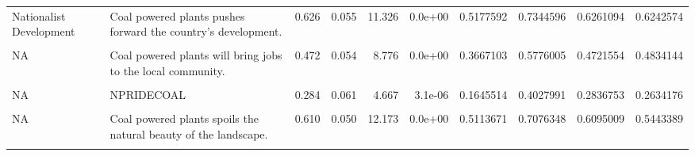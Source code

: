 \documentclass[
]{article}
\begin{document}
\begin{landscape}
\begin{table}[!h]
{\begin{tabular}[t]{l>{\raggedright\arraybackslash}p{4cm}rrrrrrrr}
Nationalist Development & Coal powered plants pushes forward the country's development. & 0.626 & 0.055 & 11.326 & 0.0e+00 & 0.5177592 & 0.7344596 & 0.6261094 & 0.6242574\\
\cellcolor{gray!6}{Nationalist Development} & \cellcolor{gray!6}{Coal powered plants brings economic prosperity to the surrounding regions.} & \cellcolor{gray!6}{0.547} & \cellcolor{gray!6}{0.054} & \cellcolor{gray!6}{10.086} & \cellcolor{gray!6}{0.0e+00} & \cellcolor{gray!6}{0.4408772} & \cellcolor{gray!6}{0.6535573} & \cellcolor{gray!6}{0.5472172} & \cellcolor{gray!6}{0.5535687}\\
NA & Coal powered plants will bring jobs to the local community. & 0.472 & 0.054 & 8.776 & 0.0e+00 & 0.3667103 & 0.5776005 & 0.4721554 & 0.4834144\\
\addlinespace
\cellcolor{gray!6}{NA} & \cellcolor{gray!6}{PRIDECOAL} & \cellcolor{gray!6}{0.338} & \cellcolor{gray!6}{0.062} & \cellcolor{gray!6}{5.485} & \cellcolor{gray!6}{0.0e+00} & \cellcolor{gray!6}{0.2173242} & \cellcolor{gray!6}{0.4590249} & \cellcolor{gray!6}{0.3381745} & \cellcolor{gray!6}{0.3081207}\\
NA & NPRIDECOAL & 0.284 & 0.061 & 4.667 & 3.1e-06 & 0.1645514 & 0.4027991 & 0.2836753 & 0.2634176\\
\cellcolor{gray!6}{NA} & \cellcolor{gray!6}{Coal powered plants poses a great risk to the health of people living around it.} & \cellcolor{gray!6}{0.702} & \cellcolor{gray!6}{0.056} & \cellcolor{gray!6}{12.572} & \cellcolor{gray!6}{0.0e+00} & \cellcolor{gray!6}{0.5927046} & \cellcolor{gray!6}{0.8116380} & \cellcolor{gray!6}{0.7021713} & \cellcolor{gray!6}{0.5798090}\\
NA & Coal powered plants spoils the natural beauty of the landscape. & 0.610 & 0.050 & 12.173 & 0.0e+00 & 0.5113671 & 0.7076348 & 0.6095009 & 0.5443389\\
\cellcolor{gray!6}{NA} & \cellcolor{gray!6}{Coal powered plants is leading to displacement of people from their land.} & \cellcolor{gray!6}{0.941} & \cellcolor{gray!6}{0.069} & \cellcolor{gray!6}{13.656} & \cellcolor{gray!6}{0.0e+00} & \cellcolor{gray!6}{0.8060444} & \cellcolor{gray!6}{1.0761975} & \cellcolor{gray!6}{0.9411209} & \cellcolor{gray!6}{0.7048765}\\
\bottomrule
\end{tabular}}
\end{table}
\end{landscape}
\end{document}
